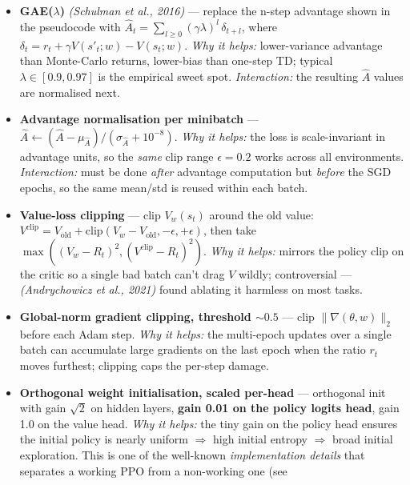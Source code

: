\documentclass[11pt]{article}
\begin{document}
\begin{itemize}
\item
  \label{trick-4-7-1}\textbf{GAE(\(\lambda\))}
  \emph{(Schulman et al., 2016)} --- replace the n-step advantage shown
  in the pseudocode with
  \(\hat A_t = \sum_{l\geq 0} (\gamma\lambda)^l\,\delta_{t+l}\), where
  \(\delta_t = r_t + \gamma V(s'_t;w) - V(s_t;w)\). \emph{Why it helps:}
  lower-variance advantage than Monte-Carlo returns, lower-bias than
  one-step TD; typical \(\lambda \in [0.9, 0.97]\) is the empirical
  sweet spot. \emph{Interaction:} the resulting \(\hat A\) values are
  normalised next.
\item
  \label{trick-4-7-2}\textbf{Advantage normalisation per
  minibatch} ---
  \(\hat A \leftarrow (\hat A - \mu_{\hat A})/(\sigma_{\hat A} + 10^{-8})\).
  \emph{Why it helps:} the loss is scale-invariant in advantage units,
  so the \emph{same} clip range \(\epsilon=0.2\) works across all
  environments. \emph{Interaction:} must be done \emph{after} advantage
  computation but \emph{before} the SGD epochs, so the same mean/std is
  reused within each batch.
\item
  \label{trick-4-7-3}\textbf{Value-loss clipping} ---
  clip \(V_w(s_t)\) around the old value:
  \(V^\text{clip} = V_\text{old} + \mathrm{clip}(V_w - V_\text{old}, -\epsilon, +\epsilon)\),
  then take \(\max((V_w - R_t)^2, (V^\text{clip} - R_t)^2)\). \emph{Why
  it helps:} mirrors the policy clip on the critic so a single bad batch
  can't drag \(V\) wildly; controversial --- \emph{(Andrychowicz et al.,
  2021)} found ablating it harmless on most tasks.
\item
  \label{trick-4-7-4}\textbf{Global-norm gradient
  clipping, threshold \(\sim 0.5\)} --- clip \(\|\nabla(\theta,w)\|_2\)
  before each Adam step. \emph{Why it helps:} the multi-epoch updates
  over a single batch can accumulate large gradients on the last epoch
  when the ratio \(r_t\) moves furthest; clipping caps the per-step
  damage.
\item
  \label{trick-4-7-5}\textbf{Orthogonal weight
  initialisation, scaled per-head} --- orthogonal init with gain
  \(\sqrt 2\) on hidden layers, \textbf{gain 0.01 on the policy logits
  head}, gain 1.0 on the value head. \emph{Why it helps:} the tiny gain
  on the policy head ensures the initial policy is nearly uniform
  \(\Rightarrow\) high initial entropy \(\Rightarrow\) broad initial
  exploration. This is one of the well-known \emph{implementation
  details} that separates a working PPO from a non-working one (see

\end{itemize}
\end{document}
